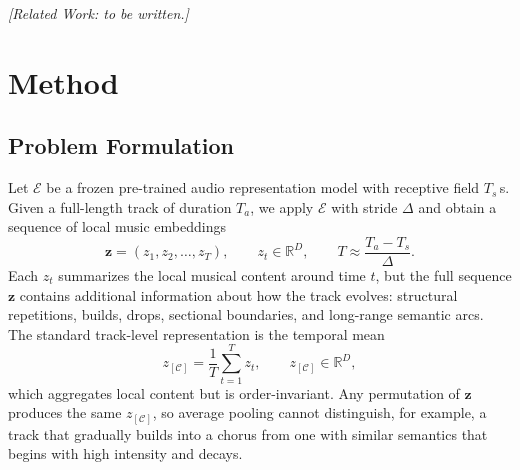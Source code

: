 \documentclass{article}
\newcommand{\zseq}{\mathbf{z}}          %
\newcommand{\zC}{z_{[\mathcal{C}]}}    %
\newcommand{\R}{\mathbb{R}}
\newcommand{\enc}{\mathcal{E}}          %
\begin{document}

\noindent\textcolor{gray!80}{\itshape[Related Work: to be written.]}

\section{Method}
\label{sec:method}

\subsection{Problem Formulation}
\label{ssec:prob}

Let $\enc$ be a frozen pre-trained audio representation model with
receptive field $T_s$\,s.  Given a full-length track of duration
$T_a$, we apply $\enc$ with stride $\Delta$ and obtain a sequence of
local music embeddings
%
\begin{equation}
  \zseq = (z_1, z_2, \ldots, z_T),
  \qquad
  z_t \in \R^D,
  \qquad
  T \approx \frac{T_a - T_s}{\Delta}.
  \label{eq:seq}
\end{equation}
%
Each $z_t$ summarizes the local musical content around time $t$,
but the full sequence $\zseq$ contains additional information about
how the track evolves: structural repetitions, builds, drops,
sectional boundaries, and long-range semantic arcs.  The standard
track-level representation is the temporal mean
%
\begin{equation}
  \zC = \frac{1}{T}\sum_{t=1}^{T} z_t,
  \qquad
  \zC \in \R^D,
  \label{eq:content}
\end{equation}
%
which aggregates local content but is order-invariant.  Any
permutation of $\zseq$ produces the same $\zC$, so average pooling
cannot distinguish, for example, a track that gradually builds into
a chorus from one with similar semantics that begins with high intensity and decays.
\end{document}
